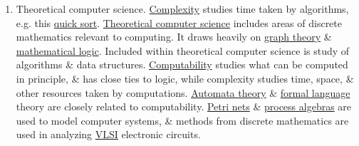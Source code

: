 \documentclass{article}
\begin{document}
\begin{enumerate}
	\item {\sf Theoretical computer science.} {\sf\href{https://en.wikipedia.org/wiki/Computational_complexity_theory}{Complexity} studies time taken by algorithms, e.g. this \href{https://en.wikipedia.org/wiki/Quicksort}{quick sort}.} \href{https://en.wikipedia.org/wiki/Theoretical_computer_science}{Theoretical computer science} includes areas of discrete mathematics relevant to computing. It draws heavily on \href{https://en.wikipedia.org/wiki/Graph_theory}{graph theory} \& \href{https://en.wikipedia.org/wiki/Mathematical_logic}{mathematical logic}. Included within theoretical computer science is study of algorithms \& data structures. \href{https://en.wikipedia.org/wiki/Computability}{Computability} studies what can be computed in principle, \& has close ties to logic, while complexity studies time, space, \& other resources taken by computations. \href{https://en.wikipedia.org/wiki/Automata_theory}{Automata theory} \& \href{https://en.wikipedia.org/wiki/Formal_language}{formal language} theory are closely related to computability. \href{https://en.wikipedia.org/wiki/Petri_net}{Petri nets} \& \href{https://en.wikipedia.org/wiki/Process_algebra}{process algebras} are used to model computer systems, \& methods from discrete mathematics are used in analyzing \href{https://en.wikipedia.org/wiki/VLSI}{VLSI} electronic circuits.
	

\end{enumerate}
\end{document}
